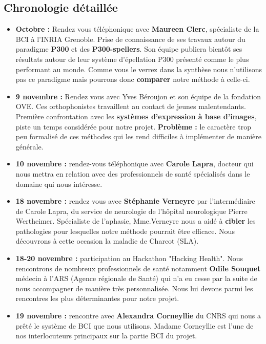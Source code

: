 \documentclass[11pt,a4paper]{article}
\theoremstyle{plain}
\theoremstyle{definition}
\begin{document}
\subsection{Chronologie détaillée}
\begin{itemize}
        \item \textbf{Octobre : } Rendez vous téléphonique avec \textbf{Maureen Clerc}, spécialiste de la BCI à l'INRIA Grenoble. Prise de connaissance de ses travaux autour du paradigme \textbf{P300} et des \textbf{P300-spellers}. Son équipe publiera bientôt ses résultats autour de leur système d'épellation P300 présenté comme le plus performant au monde. Comme vous le verrez dans la synthèse nous n'utilisons pas ce paradigme mais pourrons donc \textbf{comparer} notre méthode à celle-ci. \\
        \item \textbf{9 novembre : } Rendez vous avec Yves Béroujon et son équipe de la fondation OVE. Ces orthophonistes travaillent au contact de jeunes malentendants. Première confrontation avec les \textbf{systèmes d'expression à base d'images}, piste un temps considérée pour notre projet.  \textbf{Problème :} le caractère trop peu formalisé de ces méthodes qui les rend difficiles à implémenter de manière générale. \\
        \item \textbf{10 novembre : } rendez-vous téléphonique avec \textbf{Carole Lapra}, docteur qui nous mettra en relation avec des professionnels de santé spécialisés dans le domaine qui nous intéresse. \\
        \item \textbf{18 novembre : } rendez vous avec \textbf{Stéphanie Verneyre} par l'intermédiaire de Carole Lapra, du service de neurologie de l'hôpital neurologique Pierre Wertheimer. Spécialiste de l'aphasie, Mme.Verneyre nous a aidé à \textbf{cibler} les pathologies pour lesquelles notre méthode pourrait être efficace. Nous découvrons à cette occasion la maladie de Charcot (SLA). \\
        \item \textbf{18-20 novembre : } participation au Hackathon "Hacking Health". Nous rencontrons de nombreux professionnels de santé notamment \textbf{Odile Souquet} médecin à l'ARS (Agence régionale de Santé) qui n'a eu cesse par la suite de nous accompagner de manière très personnalisée. Nous lui devons parmi les rencontres les plus déterminantes pour notre projet. \\
        \item \textbf{19 novembre : } rencontre avec \textbf{Alexandra Corneyllie} du CNRS qui nous a prêté le système de BCI que nous utilisons. Madame Corneyllie est l'une de nos interlocuteurs principaux sur la partie BCI du projet. \\ 

\end{itemize}
\end{document}

